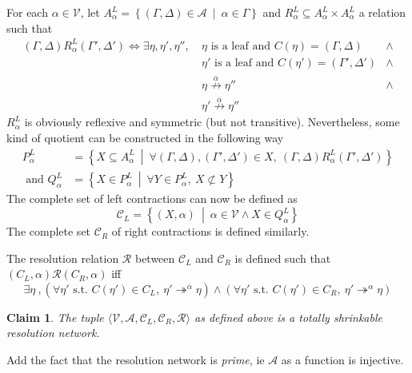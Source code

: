 \documentclass{article}
\newenvironment{comment}{\color{teal}}{}
\newtheorem{claim}{Claim}
\newcommand{\ens}[2]{\left\{ #1 ~ \middle| ~ #2 \right\}}
\newcommand{\varSet}{\mathcal{V}}
\newcommand{\axiomSet}{\mathcal{A}}
\newcommand{\conSet}{\mathcal{C}}
\newcommand{\resoSet}{\mathcal{R}}
\newcommand{\node}{\eta}
\newcommand{\pConclusion}[1]{C\left(#1\right)} %
\newcommand{\dual}[1]{\overline{#1}}
\newcommand{\nreach}[3]{#1 \overset{#2}{\nrightarrow} #3}
\newcommand{\treach}[3]{#1 \twoheadrightarrow^{#2} #3}
\begin{document}
For each $\alpha \in \varSet$, let $A_\alpha^L = \ens{(\Gamma,\Delta) \in \axiomSet}{\alpha \in \Gamma}$
and $R_\alpha^L \subseteq A_\alpha^L \times A_\alpha^L$ a relation such that
\begin{align*}
  (\Gamma,\Delta) R_\alpha^L (\Gamma', \Delta') \Longleftrightarrow \exists \node,\node',\node'',~
    & \node  \text{ is a leaf and } \pConclusion{\node}  = (\Gamma,  \Delta)  &\wedge \\
    & \node' \text{ is a leaf and } \pConclusion{\node'} = (\Gamma', \Delta') &\wedge \\
    & \nreach{\node} {\dual{\alpha}}{\node''} &\wedge \\
    & \nreach{\node'}{\dual{\alpha}}{\node''} &
\end{align*}
$R_\alpha^L$ is obviously reflexive and symmetric (but not transitive). Nevertheless, some kind of
quotient can be constructed in the following way
\begin{align*}
  P_\alpha^L &=
    \ens{X \subseteq A_\alpha^L}
        {\forall (\Gamma,\Delta),(\Gamma',\Delta') \in X ,~
          (\Gamma,\Delta) R_\alpha^L (\Gamma',\Delta')} \\
  \text{ and }
  Q_\alpha^L &= \ens{X \in P_\alpha^L}{\forall Y \in P_\alpha^L ,~ X \not\subset Y}
\end{align*}
The complete set of left contractions can now be defined as
$$ \conSet_L = \ens{(X,\alpha)}{\alpha \in \varSet \wedge X \in Q_\alpha^L} $$
The complete set $\conSet_R$ of right contractions is defined similarly.

The resolution relation $\resoSet$ between $\conSet_L$ and $\conSet_R$ is defined such that
$(C_L,\alpha) \resoSet (C_R,\alpha)$ iff
$$
  \exists \node ~,
    \left( \forall \node' \text{ s.t. } \pConclusion{\node'} \in C_L ,~
              \treach{\node'}{\dual{\alpha}}{\node} \right) \wedge
    \left( \forall \node' \text{ s.t. } \pConclusion{\node'} \in C_R ,~
              \treach{\node'}{\alpha}{\node} \right)
$$

\begin{claim}
The tuple $\langle \varSet, \axiomSet, \conSet_L, \conSet_R, \resoSet \rangle$ as defined above is a
totally shrinkable resolution network.
\end{claim}

\begin{comment} Add the fact that the resolution network is \emph{prime}, ie $\axiomSet$ as a function is
  injective.
\end{comment}
\end{document}

